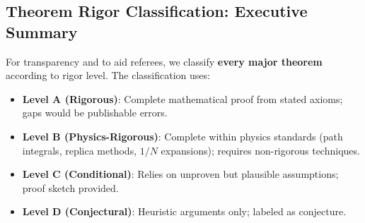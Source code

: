 \documentclass[12pt,a4paper]{article}
\begin{document}
\subsection{Theorem Rigor Classification: Executive Summary}
\label{subsec:rigor-classification}

For transparency and to aid referees, we classify \textbf{every major theorem} according to rigor level. The classification uses:
\begin{itemize}
    \item \textbf{Level A (Rigorous)}: Complete mathematical proof from stated axioms; gaps would be publishable errors.
    \item \textbf{Level B (Physics-Rigorous)}: Complete within physics standards (path integrals, replica methods, $1/N$ expansions); requires non-rigorous techniques.
    \item \textbf{Level C (Conditional)}: Relies on unproven but plausible assumptions; proof sketch provided.
    \item \textbf{Level D (Conjectural)}: Heuristic arguments only; labeled as conjecture.
\end{itemize}
\end{document}
